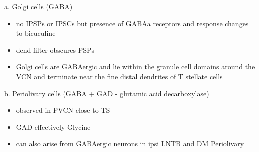 


a. Golgi cells (GABA)

\begin{itemize}
\item no IPSPs or IPSCs but presence of GABAa receptors and response changes to bicuculine \citep{WuOertel:1986,OertelWickesberg:1993,FerragamoGoldingEtAl:1998a}
\item dend filter obscures PSPs
\item Golgi cells are GABAergic and lie within the granule cell domains around the VCN and terminate near the fine distal dendrites of T stellate cells
\end{itemize}

b. Periolivary cells (GABA + GAD - glutamic acid decarboxylase)

\begin{itemize}
\item observed in PVCN close to TS \citep{AdamsMugnaini:1987}
\item GAD effectively Glycine \citep{GoldingOertel:1997}
\item can also arise from GABAergic neurons in ipsi LNTB and DM Periolivary
\end{itemize}

